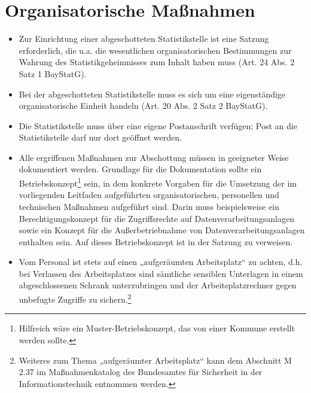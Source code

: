 \section{Organisatorische Maßnahmen}
    \begin{itemize}
        \item Zur Einrichtung einer abgeschotteten Statistikstelle ist eine Satzung erforderlich, die u.a. die wesentlichen organisatorischen Bestimmungen zur Wahrung des Statistikgeheimnisses zum Inhalt haben muss (Art. 24 Abs. 2 Satz 1 BayStatG).
        \item Bei der abgeschotteten Statistikstelle muss es sich um eine eigenständige organisatorische Einheit handeln (Art. 20 Abs. 2 Satz 2 BayStatG).
        \item Die Statistikstelle muss über eine eigene Postanschrift verfügen; Post an die Statistikstelle darf nur dort geöffnet werden.
        \item Alle ergriffenen Maßnahmen zur Abschottung müssen in geeigneter Weise dokumentiert werden. Grundlage für die Dokumentation sollte ein Betriebskonzept\footnote{Hilfreich wäre ein Muster-Betriebskonzept, das von einer Kommune erstellt werden sollte.} sein, in dem konkrete Vorgaben für die Umsetzung der im vorliegenden Leitfaden aufgeführten organisatorischen, personellen und technischen Maßnahmen aufgeführt sind. Darin muss beispielsweise ein Berechtigungskonzept für die Zugriffsrechte auf Datenverarbeitungsanlagen sowie ein Konzept für die Außerbetriebnahme von Datenverarbeitungsanlagen enthalten sein. Auf dieses Betriebskonzept ist in der Satzung zu verweisen.
        \item Vom Personal ist stets auf einen „aufgeräumten Arbeitsplatz“ zu achten, d.h. bei Verlassen des Arbeitsplatzes sind sämtliche sensiblen Unterlagen in einem abgeschlossenen Schrank unterzubringen und der Arbeitsplatzrechner gegen unbefugte Zugriffe zu sichern.\footnote{Weiteres zum Thema „aufgeräumter Arbeitsplatz“ kann dem Abschnitt M 2.37 im Maßnahmenkatalog des Bundesamtes für Sicherheit in der Informationstechnik entnommen werden.}
    \end{itemize}
 
